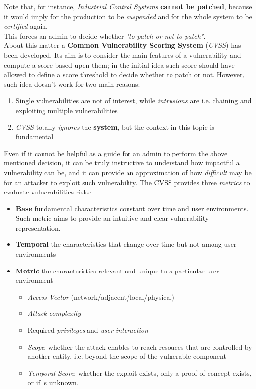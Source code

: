 Note that, for instance, \textit{Industrial Control Systems} \textbf{cannot be patched}, because it would imply for the production to be \textit{suspended} and for the whole system to be \textit{certified} again.\\
This forces an admin to decide whether \textit{"to-patch or not to-patch"}.\\
About this matter a \textbf{Common Vulnerability Scoring System} (\textit{CVSS}) has been developed.
Its aim is to consider the main features of a vulnerability and compute a score based upon them;
in the initial idea such score should have allowed to define a score threshold to decide whether to patch or not.
However, such idea doesn't work for two main reasons:
\begin{enumerate}
    \item Single vulnerabilities are not of interest, while \textit{intrusions} are i.e. chaining and exploiting multiple vulnerabilities
    \item \textit{CVSS} totally \textit{ignores} the \textbf{system}, but the context in this topic is fundamental 
\end{enumerate}
Even if it cannot be helpful as a guide for an admin to perform the above mentioned decision, it can be truly instructive to understand how impactful a vulnerability can be, 
and it can provide an approximation of how \textit{difficult} may be for an attacker to exploit such vulnerability.
The CVSS provides three \textit{metrics} to evaluate vulnerabilities risks:
\begin{itemize}
    \item \textbf{Base} fundamental characteristics constant over time and user environments.
    Such metric aims to provide an intuitive and clear vulnerability representation.
    \item \textbf{Temporal} the characteristics that change over time but not among user environments
    \item \textbf{Metric} the characteristics relevant and unique to a particular user environment
    \begin{itemize}
        \item \textit{Access Vector} (network/adjacent/local/physical)
        \item \textit{Attack complexity}
        \item Required \textit{privileges} and \textit{user interaction}
        \item \textit{Scope}: whether the attack enables to reach resouces that are controlled by another entity, i.e. beyond the scope of the vulnerable component
        \item \textit{Temporal Score}: whether the exploit exists, only a proof-of-concept exists, or if is unknown.
    \end{itemize}
\end{itemize}

